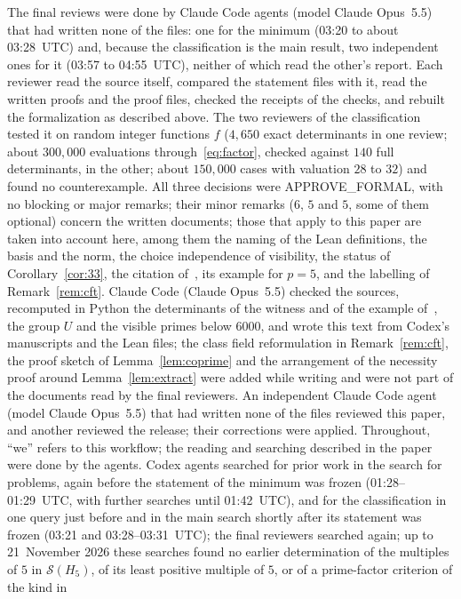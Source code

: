 \documentclass[11pt]{article}
\theoremstyle{definition}
\theoremstyle{remark}
\newcommand{\cS}{\mathcal S}
\begin{document}
The final reviews were done by Claude Code agents (model Claude Opus~5.5) that
had written none of the files: one for the minimum (03:20 to about 03:28~UTC)
and, because the classification is the main result, two independent ones for
it (03:57 to 04:55~UTC), neither of which read the other's report. Each
reviewer read the source itself, compared the statement files with it, read
the written proofs and the proof files, checked the receipts of the checks,
and rebuilt the formalization as described above. The two reviewers of the classification tested it on random integer
functions $f$ ($4{,}650$ exact determinants in one review; about $300{,}000$
evaluations through~\eqref{eq:factor}, checked against $140$ full
determinants, in the other; about $150{,}000$ cases with valuation $28$ to
$32$) and found no counterexample. All
three decisions were APPROVE\_FORMAL, with no blocking or major remarks; their
minor remarks ($6$, $5$ and $5$, some of them optional) concern the written
documents; those that apply to this paper are taken into account here, among them the naming of the Lean definitions, the
basis and the norm, the choice independence of visibility, the status of
Corollary~\ref{cor:33}, the citation of~\cite{mp}, its example for $p=5$, and
the labelling of Remark~\ref{rem:cft}. Claude Code (Claude Opus~5.5) checked
the sources, recomputed in Python the determinants of the witness and of the
example of~\cite{mp}, the group $U$ and the visible primes below $6000$, and
wrote this text from Codex's manuscripts and the Lean files; the class field
reformulation in Remark~\ref{rem:cft}, the proof sketch of
Lemma~\ref{lem:coprime} and the arrangement of the necessity proof around
Lemma~\ref{lem:extract} were added while writing and were not part of the
documents read by the final reviewers. An independent Claude Code agent (model Claude Opus~5.5) that had written none of the files reviewed this paper, and another reviewed the release; their corrections were applied. Throughout, ``we''
refers to this workflow; the reading and searching described in the paper
were done by the agents. Codex agents searched for prior work in the search for
problems, again before the statement of the minimum was frozen (01:28--01:29~UTC,
with further searches until 01:42~UTC), and for the classification in one
query just before and in the main search shortly after its statement was frozen
(03:21 and 03:28--03:31~UTC); the final reviewers
searched again; up to 21~November 2026 these searches found no earlier
determination of the multiples of $5$ in $\cS(H_5)$, of its least positive
multiple of $5$, or of a prime-factor criterion of the kind in
\end{document}
